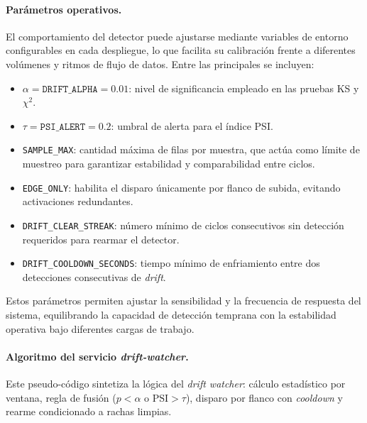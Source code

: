 \paragraph{Parámetros operativos.}  
El comportamiento del detector puede ajustarse mediante variables de entorno configurables en cada despliegue, lo que facilita su calibración frente a diferentes volúmenes y ritmos de flujo de datos.  
Entre las principales se incluyen:
\begin{itemize}\setlength\itemsep{2pt}
  \item \(\alpha = \texttt{DRIFT\_ALPHA} = 0.01\): nivel de significancia empleado en las pruebas KS y $\chi^2$.
  \item \(\tau = \texttt{PSI\_ALERT} = 0.2\): umbral de alerta para el índice PSI.
  \item \texttt{SAMPLE\_MAX}: cantidad máxima de filas por muestra, que actúa como límite de muestreo para garantizar estabilidad y comparabilidad entre ciclos.
  \item \texttt{EDGE\_ONLY}: habilita el disparo únicamente por flanco de subida, evitando activaciones redundantes.
  \item \texttt{DRIFT\_CLEAR\_STREAK}: número mínimo de ciclos consecutivos sin detección requeridos para rearmar el detector.
  \item \texttt{DRIFT\_COOLDOWN\_SECONDS}: tiempo mínimo de enfriamiento entre dos detecciones consecutivas de \textit{drift}.
\end{itemize}

Estos parámetros permiten ajustar la sensibilidad y la frecuencia de respuesta del sistema, equilibrando la capacidad de detección temprana con la estabilidad operativa bajo diferentes cargas de trabajo.

\paragraph{Algoritmo del servicio \textit{drift-watcher}.}
Este pseudo-código sintetiza la lógica del \textit{drift watcher}: cálculo estadístico por ventana, regla de fusión ($p < \alpha$ o $\mathrm{PSI}>\tau$), disparo por flanco con \textit{cooldown} y rearme condicionado a rachas limpias.

